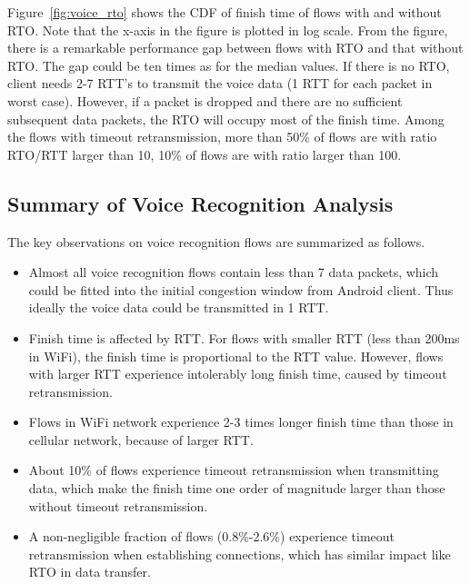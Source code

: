 Figure~\ref{fig:voice_rto} shows the CDF of finish time of flows with and without RTO. Note that the x-axis in the figure is plotted in log scale. From the figure, there is a remarkable performance gap between flows with RTO and that without RTO. The gap could be ten times as for the median values. If there is no RTO, client needs 2-7 RTT's to transmit the voice data (1 RTT for each packet in worst case). However, if a packet is dropped and there are no sufficient subsequent data packets, the RTO will occupy most of the finish time. Among the flows with timeout retransmission, more than 50\% of flows are with ratio RTO/RTT larger than 10, 10\% of flows are with ratio larger than 100.

\subsection{Summary of Voice Recognition Analysis}

The key observations on voice recognition flows are summarized as follows.
\begin{itemize}
	\item Almost all voice recognition flows contain less than 7 data packets, which could be fitted into the initial congestion window from Android client. Thus ideally the voice data could be transmitted in 1 RTT.
	\item Finish time is affected by RTT. For flows with smaller RTT (less than 200ms in WiFi), the finish time is proportional to the RTT value. However, flows with larger RTT experience intolerably long finish time, caused by timeout retransmission.
	\item Flows in WiFi network experience 2-3 times longer finish time than those in cellular network, because of larger RTT.
	\item About 10\% of flows experience timeout retransmission when transmitting data, which make the finish time one order of magnitude larger than those without timeout retransmission.
	\item A non-negligible fraction of flows (0.8\%-2.6\%) experience timeout retransmission when establishing connections, which has similar impact like RTO in data transfer.
\end{itemize}